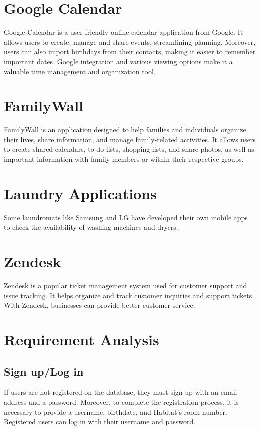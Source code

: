 \documentclass[conference]{IEEEtran}
\begin{document}
\section*{Google Calendar}
Google Calendar is a user-friendly online calendar application from Google. It allows users to create, manage and share events, streamlining planning. Moreover, users can also import birthdays from their contacts, making it easier to remember important dates. Google integration and various viewing options make it a valuable time management and organization tool.
\section*{FamilyWall}
FamilyWall is an application designed to help families and individuals organize their lives, share information, and manage family-related activities. It allows users to create shared calendars, to-do lists, shopping lists, and share photos, as well as important information with family members or within their respective groups.
\section*{Laundry Applications}
Some laundromats like Samsung and LG have developed their own mobile apps to check the availability of washing machines and dryers.
\section*{Zendesk}
Zendesk is a popular ticket management system used for customer support and issue tracking. It helps organize and track customer inquiries and support tickets. With Zendesk, businesses can provide better customer service.


\section{Requirement Analysis}
\subsection{Sign up/Log in}
If users are not registered on the database, they must sign up with an email address and a password. Moreover, to complete the registration process, it is necessary to provide a username, birthdate, and Habitat’s room number.
Registered users can log in with their username and password.
\end{document}

